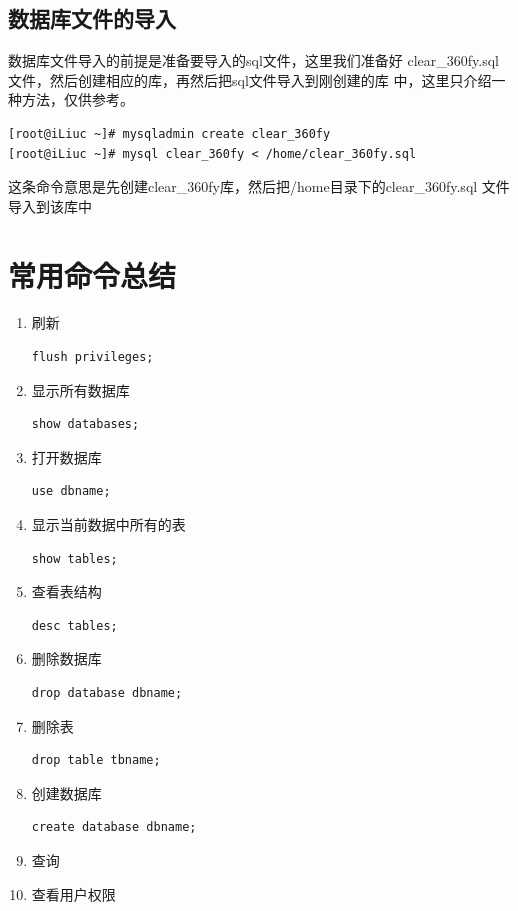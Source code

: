 \subsection{数据库文件的导入}
\label{sec:importData}

数据库文件导入的前提是准备要导入的sql文件，这里我们准备好
clear\_360fy.sql文件，然后创建相应的库，再然后把sql文件导入到刚创建的库
中，这里只介绍一种方法，仅供参考。

\small{
\begin{verbatim}
[root@iLiuc ~]# mysqladmin create clear_360fy 
[root@iLiuc ~]# mysql clear_360fy < /home/clear_360fy.sql
\end{verbatim}
}
\normalsize

这条命令意思是先创建clear\_360fy库，然后把/home目录下的clear\_360fy.sql
文件导入到该库中

\section{常用命令总结}

\begin{enumerate}[itemsep=0pt,parsep=0pt]
\item 刷新
\begin{verbatim}
flush privileges;
\end{verbatim}
\item 显示所有数据库
\begin{verbatim}
show databases;
\end{verbatim}
\item 打开数据库
\begin{verbatim}
use dbname;
\end{verbatim}
\item 显示当前数据中所有的表
\begin{verbatim}
show tables;
\end{verbatim}
\item 查看表结构
\begin{verbatim}
desc tables;
\end{verbatim}
\item 删除数据库
\begin{verbatim}
drop database dbname;
\end{verbatim}
\item 删除表
\begin{verbatim}
drop table tbname;
\end{verbatim}
\item 创建数据库
\begin{verbatim}
create database dbname;
\end{verbatim}
\item 查询
\item 查看用户权限
\end{enumerate}

